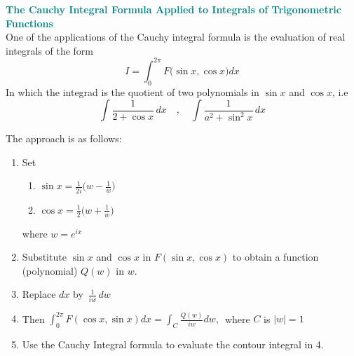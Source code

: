 \documentclass[11pt,a4paper]{article}
\theoremstyle{definition}
\begin{document}
\textbf{\textcolor{teal}{The Cauchy Integral Formula Applied to Integrals of Trigonometric Functions}}\\
One of the applications of the Cauchy integral formula is the evaluation of real integrals of the form $$I = \int^{2\pi}_0 F\big(\sin x, \cos x\big) dx$$
In which the integrad is the quotient of two polynomials in $\sin x$ and $\cos x$, i.e
$$\int \frac{1}{2 + \cos x}\,dx \quad , \quad  \int \frac{1}{a^2 + \sin^2 x}\,dx$$

The approach is as follows:
\begin{enumerate}
\item Set 
\begin{enumerate}
      \item[]    $\displaystyle{\sin x = \frac{1}{2i} \Bigg( w - \frac{1}{w}\Bigg)}$\\
      
      \item[]    $\displaystyle{\cos x = \frac{1}{2} \Bigg( w + \frac{1}{w}\Bigg)}$
\end{enumerate}
where $w = e^{ix}$\\

\item Substitute $\sin x$ and $\cos x$ in $F(\sin x, \cos x)$ to obtain a function (polynomial) $Q(w)$ in $w$.

\item Replace $dx$ by $\, \frac{1}{iw}\,dw$

\item Then $\displaystyle{\int_0^{2\pi} F(\cos x , \sin x ) dx  = \int_C \frac{Q(w)}{iw}dw},\,$ where $C$ is $\left|w\right| = 1$

\item Use the Cauchy Integral formula to evaluate the contour integral in 4.\\\\
\end{enumerate}
\end{document}
